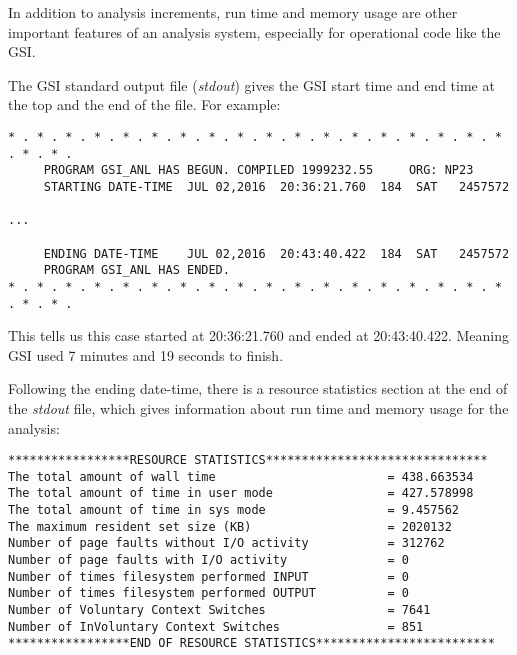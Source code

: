 In addition to analysis increments, run time and memory usage are other important features of an analysis system, especially for operational code like the GSI.
 
The GSI standard output file (\textit{stdout}) gives the GSI start time and end time at the top and the end of the file. For example:

\begin{scriptsize}
\begin{verbatim}
* . * . * . * . * . * . * . * . * . * . * . * . * . * . * . * . * . * . * . * .
     PROGRAM GSI_ANL HAS BEGUN. COMPILED 1999232.55     ORG: NP23
     STARTING DATE-TIME  JUL 02,2016  20:36:21.760  184  SAT   2457572

...
 
     ENDING DATE-TIME    JUL 02,2016  20:43:40.422  184  SAT   2457572
     PROGRAM GSI_ANL HAS ENDED.
* . * . * . * . * . * . * . * . * . * . * . * . * . * . * . * . * . * . * . * .
\end{verbatim}
\end{scriptsize}

This tells us this case started at 20:36:21.760  and ended at 20:43:40.422. Meaning GSI used 7 minutes and 19 seconds to finish.

Following the ending date-time, there is a resource statistics section at the end of the \textit{stdout} file, which gives information about run time and memory usage for the analysis:

\begin{scriptsize}
\begin{verbatim}
*****************RESOURCE STATISTICS*******************************
The total amount of wall time                        = 438.663534
The total amount of time in user mode                = 427.578998
The total amount of time in sys mode                 = 9.457562
The maximum resident set size (KB)                   = 2020132
Number of page faults without I/O activity           = 312762
Number of page faults with I/O activity              = 0
Number of times filesystem performed INPUT           = 0
Number of times filesystem performed OUTPUT          = 0
Number of Voluntary Context Switches                 = 7641
Number of InVoluntary Context Switches               = 851
*****************END OF RESOURCE STATISTICS*************************
\end{verbatim}
\end{scriptsize}
